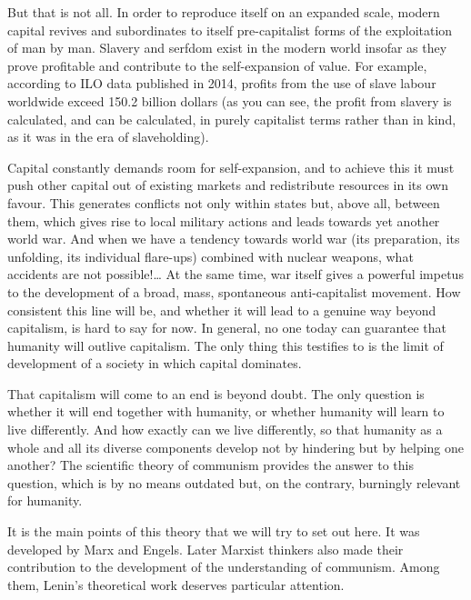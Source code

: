 \documentclass[../main]{subfiles}
\begin{document}
But that is not all. In order to reproduce itself on an expanded scale, modern capital revives and subordinates to itself pre-capitalist forms of the exploitation of man by man. Slavery and serfdom exist in the modern world insofar as they prove profitable and contribute to the self-expansion of value. For example, according to ILO data published in 2014, profits from the use of slave labour worldwide exceed 150.2 billion dollars (as you can see, the profit from slavery is calculated, and can be calculated, in purely capitalist terms rather than in kind, as it was in the era of slaveholding).

Capital constantly demands room for self-expansion, and to achieve this it must push other capital out of existing markets and redistribute resources in its own favour. This generates conflicts not only within states but, above all, between them, which gives rise to local military actions and leads towards yet another world war. And when we have a tendency towards world war (its preparation, its unfolding, its individual flare-ups) combined with nuclear weapons, what accidents are not possible!… At the same time, war itself gives a powerful impetus to the development of a broad, mass, spontaneous anti-capitalist movement. How consistent this line will be, and whether it will lead to a genuine way beyond capitalism, is hard to say for now. In general, no one today can guarantee that humanity will outlive capitalism. The only thing this testifies to is the limit of development of a society in which capital dominates.

That capitalism will come to an end is beyond doubt. The only question is whether it will end together with humanity, or whether humanity will learn to live differently. And how exactly can we live differently, so that humanity as a whole and all its diverse components develop not by hindering but by helping one another? The scientific theory of communism provides the answer to this question, which is by no means outdated but, on the contrary, burningly relevant for humanity.

It is the main points of this theory that we will try to set out here. It was developed by Marx and Engels. Later Marxist thinkers also made their contribution to the development of the understanding of communism. Among them, Lenin's theoretical work deserves particular attention.
\end{document}
